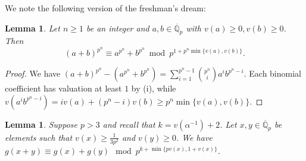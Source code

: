 \documentclass{amsart}
\newtheorem{lemma}[theorem]{Lemma}
\theoremstyle{definition}
\newcommand{\Q}{\mathbb{Q}}
\numberwithin{theorem}{section}
\numberwithin{equation}{section}
\begin{document}
We note the following version of the freshman's dream:
\begin{lemma}\label{lemma: freshmans dream}
Let $n\geq 1$ be an integer and $a,b \in \overline{\Q}_p$ with $v(a) \geq 0, v(b) \geq 0$. Then
\[
(a+b)^{p^n} \equiv a^{p^n}+b^{p^n} \bmod p^{ 1 + p^n \min\{v(a), v(b)\}}.
\]
\end{lemma}
\begin{proof}
We have $(a+b)^{p^n} - (a^{p^n}+b^{p^n}) = \sum_{i=1}^{p^n-1}\binom{p^n}{i} a^ib^{p^n-i}$. Each binomial coefficient has valuation at least $1$ by (i), while $v(a^i b^{p^n-i})=i v(a) + (p^n-i) v(b) \geq p^n \min\{ v(a), v(b) \}$.
\end{proof}


\begin{lemma}\label{lemma: g(x+y) = g(x) + g(y)}
    Suppose $p >3$ and recall that $k=v(\alpha^{-1})+2$. Let $x,y \in \overline{\Q}_p$ be elements such that $v(x) \ge \frac{1}{3p^2}$ and $v(y) \ge 0$. 
    We have $g(x+y) \equiv g(x) + g(y) \mod p^{k + \min\{pv(x), 1+v(x)\}}$.
\end{lemma}
\end{document}
